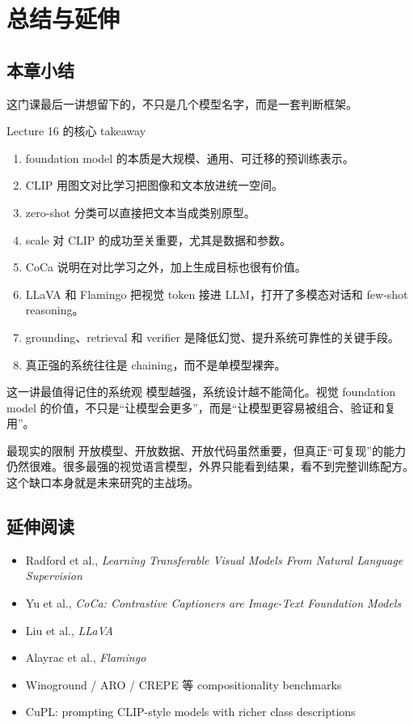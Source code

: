 \section{总结与延伸}

\subsection{本章小结}

这门课最后一讲想留下的，不只是几个模型名字，而是一套判断框架。

\begin{importantbox}{Lecture 16 的核心 takeaway}
\begin{enumerate}
    \item foundation model 的本质是大规模、通用、可迁移的预训练表示。
    \item CLIP 用图文对比学习把图像和文本放进统一空间。
    \item zero-shot 分类可以直接把文本当成类别原型。
    \item scale 对 CLIP 的成功至关重要，尤其是数据和参数。
    \item CoCa 说明在对比学习之外，加上生成目标也很有价值。
    \item LLaVA 和 Flamingo 把视觉 token 接进 LLM，打开了多模态对话和 few-shot reasoning。
    \item grounding、retrieval 和 verifier 是降低幻觉、提升系统可靠性的关键手段。
    \item 真正强的系统往往是 chaining，而不是单模型裸奔。
\end{enumerate}
\end{importantbox}

\begin{knowledgebox}{这一讲最值得记住的系统观}
模型越强，系统设计越不能简化。视觉 foundation model 的价值，不只是“让模型会更多”，而是“让模型更容易被组合、验证和复用”。
\end{knowledgebox}

\begin{warningbox}{最现实的限制}
开放模型、开放数据、开放代码虽然重要，但真正“可复现”的能力仍然很难。很多最强的视觉语言模型，外界只能看到结果，看不到完整训练配方。这个缺口本身就是未来研究的主战场。
\end{warningbox}

\subsection{延伸阅读}

\begin{itemize}
    \item Radford et al., \emph{Learning Transferable Visual Models From Natural Language Supervision}
    \item Yu et al., \emph{CoCa: Contrastive Captioners are Image-Text Foundation Models}
    \item Liu et al., \emph{LLaVA}
    \item Alayrac et al., \emph{Flamingo}
    \item Winoground / ARO / CREPE 等 compositionality benchmarks
    \item CuPL: prompting CLIP-style models with richer class descriptions
\end{itemize}


